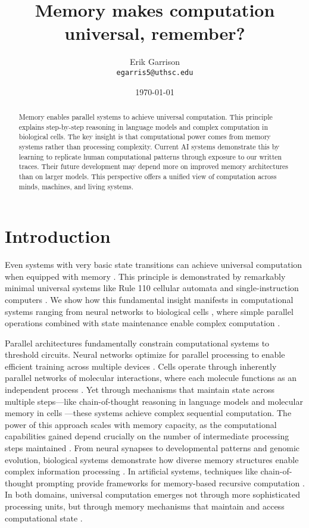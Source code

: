 \documentclass[12pt]{article}
\title{Memory makes computation universal, remember?}
\author{Erik Garrison\\
  \texttt{egarris5@uthsc.edu}\\[1ex]
  }
\date{\today}
\begin{document}
\maketitle

\begin{abstract}
Memory enables parallel systems to achieve universal computation.
This principle explains step-by-step reasoning in language models and complex computation in biological cells.
The key insight is that computational power comes from memory systems rather than processing complexity.
Current AI systems demonstrate this by learning to replicate human computational patterns through exposure to our written traces.
Their future development may depend more on improved memory architectures than on larger models.
This perspective offers a unified view of computation across minds, machines, and living systems.
\end{abstract}

\section{Introduction}
Even systems with very basic state transitions can achieve universal computation when equipped with memory \cite{merrill2023parallelism,peng2024limitations}.
This principle is demonstrated by remarkably minimal universal systems like Rule 110 cellular automata \cite{cook2004universality} and single-instruction computers \cite{savage1994space}.
We show how this fundamental insight manifests in computational systems ranging from neural networks to biological cells \cite{wang2023parallel}, where simple parallel operations combined with state maintenance enable complex computation \cite{swamy1983space,bisaz2024memory}.

Parallel architectures fundamentally constrain computational systems to threshold circuits.
Neural networks optimize for parallel processing to enable efficient training across multiple devices \cite{merrill2023parallelism,merrill2024}.
Cells operate through inherently parallel networks of molecular interactions, where each molecule functions as an independent process \cite{fu2023scgrn}.
Yet through mechanisms that maintain state across multiple steps---like chain-of-thought reasoning in language models \cite{wei2022chain,qiu2024ask} and molecular memory in cells \cite{hoel2020emergence}---these systems achieve complex sequential computation.
The power of this approach scales with memory capacity, as the computational capabilities gained depend crucially on the number of intermediate processing steps maintained \cite{merrill2024}.
From neural synapses to developmental patterns and genomic evolution, biological systems demonstrate how diverse memory structures enable complex information processing \cite{burrill2010making,espinosa2024molecular}.
In artificial systems, techniques like chain-of-thought prompting provide frameworks for memory-based recursive computation \cite{wei2022chain,dickson2024trust,ahn2024recursive}.
In both domains, universal computation emerges not through more sophisticated processing units, but through memory mechanisms that maintain and access computational state \cite{schuurmans2024autoregressive}.
\end{document}
